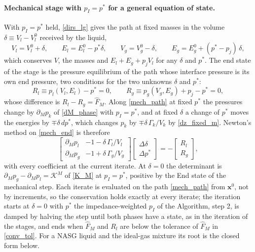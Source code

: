 \paragraph{Mechanical stage with $p_I=p^*$ for a general equation of state.}
With $p_I=p^*$ held, \eqref{dirs_lg} gives the path at fixed masses in the volume $\delta\equiv V_l-V_l^0$ received by the liquid,
\begin{equation}\label{mech_path}
V_l=V_l^0+\delta,\qquad E_l=E_l^0-p^*\delta,\qquad V_g=V_g^0-\delta,\qquad E_g=E_g^0+(p^*-p_{j})\,\delta,
\end{equation}
which conserves $V$, the masses and $E_l+E_g+p_{j}V_l$ for any $\delta$ and $p^*$. The end state of the stage is the pressure equilibrium of the path whose interface pressure is its own end pressure, two conditions for the two unknowns $\delta$ and $p^*$:
\begin{equation}\label{mech_end}
R_l\equiv p_l(V_l,E_l)-p^*=0,\qquad R_g\equiv p_g(V_g,E_g)+p_{j}-p^*=0,
\end{equation}
whose difference is $R_l-R_g=\hat{F}_M$. Along \eqref{mech_path} at fixed $p^*$ the pressures change by $\partial_Mp_k$ of \eqref{dM_phase} with $p_I=p^*$, and at fixed $\delta$ a change of $p^*$ moves the energies by $\mp\delta\,dp^*$, which changes $p_k$ by $\mp\delta\,\Gamma_k/V_k$ by \eqref{dz_fixed_m}. Newton's method on \eqref{mech_end} is therefore
\begin{equation}\label{mech_newton}
\begin{bmatrix}\partial_Mp_l & -1-\delta\,\Gamma_l/V_l\\[2pt] \partial_Mp_g & -1+\delta\,\Gamma_g/V_g\end{bmatrix}
\begin{bmatrix}\Delta\delta\\ \Delta p^*\end{bmatrix}=-\begin{bmatrix}R_l\\ R_g\end{bmatrix},
\end{equation}
with every coefficient at the current iterate. At $\delta=0$ the determinant is $\partial_Mp_g-\partial_Mp_l=\mathcal{K}^M$ of \eqref{K_M} at $p_I=p^*$, positive by the End state of the mechanical step. Each iterate is evaluated on the path \eqref{mech_path} from $\boldsymbol{x}^0$, not by increments, so the conservation holds exactly at every iterate; the iteration starts at $\delta=0$ with $p^*$ the impedance-weighted $p_I$ of the Algorithm, step 2, is damped by halving the step until both phases have a state, as in the iteration of the stages, and ends when $\hat{F}_M$ and $R_l$ are below the tolerance of $\hat{F}_M$ in \eqref{conv_tol}. For a NASG liquid and the ideal-gas mixture its root is the closed form below.

